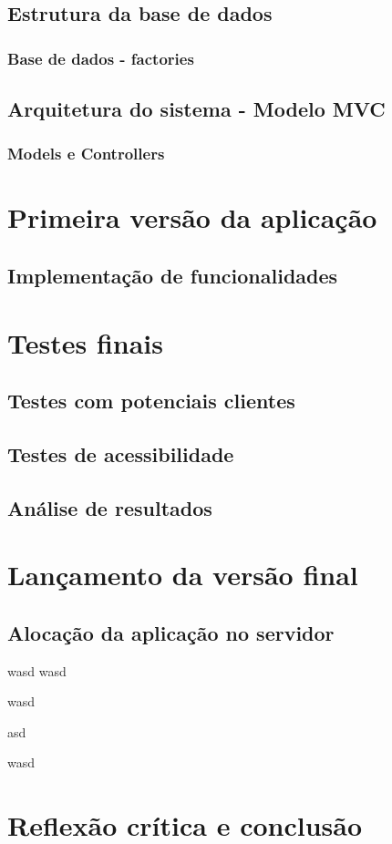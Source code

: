 \documentclass[11pt, twoside]{report}
\begin{document}
	\section{Estrutura da base de dados}
	\subsection{Base de dados - factories}
	\section{Arquitetura do sistema - Modelo MVC}
	\subsection{Models e Controllers}
	
	\chapter{Primeira versão da aplicação}
	\section{Implementação de funcionalidades}
	
	\chapter{Testes finais}
	\section{Testes com potenciais clientes}
	\section{Testes de acessibilidade}
	\section{Análise de resultados}
	
	\chapter{Lançamento da versão final}
	\section{Alocação da aplicação no servidor}
	
	\pagebreak
	wasd
	wasd
	
	
	wasd
	
	
	\pagebreak
	
	asd
	
	wasd
	\chapter{Reflexão crítica e conclusão}
	
	

	
	
	
\end{document}
